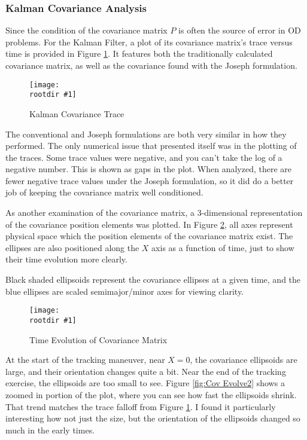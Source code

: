\documentclass[12pt,a4paper,oneside]{article}
\numberwithin{equation}{section}   		%
\newcommand{\rootdir}{./Figures/}
\newcommand{\figH}[3]{
			\begin{figure}[H]
				\centering
				\texttt{[image: \\rootdir \#1]}
				\caption{#2}
				\label{#3}
			\end{figure}
			}
\newcommand{\fig}[3]{
			\begin{figure}
				\centering
				\texttt{[image: \\rootdir \#1]}
				\caption{#2}
				\label{#3}
			\end{figure}
			}
\begin{document}
\subsubsection{Kalman Covariance Analysis}
\label{sec:Kalman Cov}

Since the condition of the covariance matrix $P$ is often the source of error in OD problems. For the Kalman Filter, a plot of its covariance matrix's trace versus time is provided in Figure \ref{fig:Kalman Trace}. It features both the traditionally calculated covariance matrix, as well as the covariance found with the Joseph formulation. 

\fig{KalmanCov.eps}{Kalman Covariance Trace}{fig:Kalman Trace}

The conventional and Joseph formulations are both very similar in how they performed. The only numerical issue that presented itself was in the plotting of the traces. Some trace values were negative, and you can't take the log of a negative number. This is shown as gaps in the plot. When analyzed, there are fewer negative trace values under the Joseph formulation, so it did do a better job of keeping the covariance matrix well conditioned. 

As another examination of the covariance matrix, a 3-dimensional representation of the covariance position elements was plotted. In Figure \ref{fig:Cov Evolve}, all axes represent physical space which the position elements of the covariance matrix exist. The ellipses are also positioned along the $X$ axis as a function of time, just to show their time evolution more clearly. 

Black shaded ellipsoids represent the covariance ellipses at a given time, and the blue ellipses are scaled semimajor/minor axes for viewing clarity.


\figH{CovEvo.eps}{Time Evolution of Covariance Matrix}{fig:Cov Evolve}

At the start of the tracking maneuver, near $X=0$, the covariance ellipsoids are large, and their orientation changes quite a bit. Near the end of the tracking exercise, the ellipsoids are too small to see. Figure \ref{fig:Cov Evolve2} shows a zoomed in portion of the plot, where you can see how fast the ellipsoids shrink. That trend matches  the trace falloff from Figure \ref{fig:Kalman Trace}. I found it particularly interesting how not just the size, but the orientation of the ellipsoids changed so much in the early times. 
\end{document}
